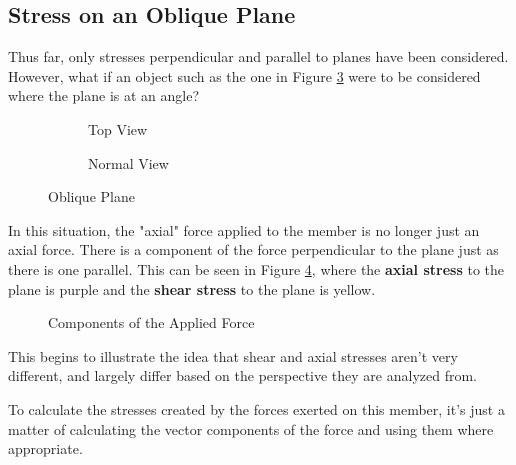 \documentclass[12pt]{article}
\begin{document}
\subsection{Stress on an Oblique Plane}
\label{ssec:stressOnAnObliquePlace}

Thus far, only stresses perpendicular and parallel to planes have been considered. However, what if an object such as the one in Figure \ref{fig:obliquePlane} were to be considered where the plane is at an angle?

\begin{figure}[H]
  \centering
  \begin{subfigure}[H]{0.45\textwidth}
    \centering
    
    \caption{Top View}
    \label{fig:011}
  \end{subfigure}
  \begin{subfigure}[H]{0.45\textwidth}
    \centering
    
    \caption{Normal View}
    \label{fig:012}
  \end{subfigure}
  \caption{Oblique Plane}
  \label{fig:obliquePlane}
\end{figure}

In this situation, the "axial" force applied to the member is no longer just an axial force. There is a component of the force perpendicular to the plane just as there is one parallel. This can be seen in Figure \ref{fig:013}, where the {\color{ma} \textbf{axial stress}} to the plane is purple and the {\color{ye} \textbf{shear stress}} to the plane is yellow.

\begin{figure}[H]
  \centering
  
  \caption{Components of the Applied Force}
  \label{fig:013}
\end{figure}

This begins to illustrate the idea that shear and axial stresses aren't very different, and largely differ based on the perspective they are analyzed from.

To calculate the stresses created by the forces exerted on this member, it's just a matter of calculating the vector components of the force and using them where appropriate.
\end{document}
